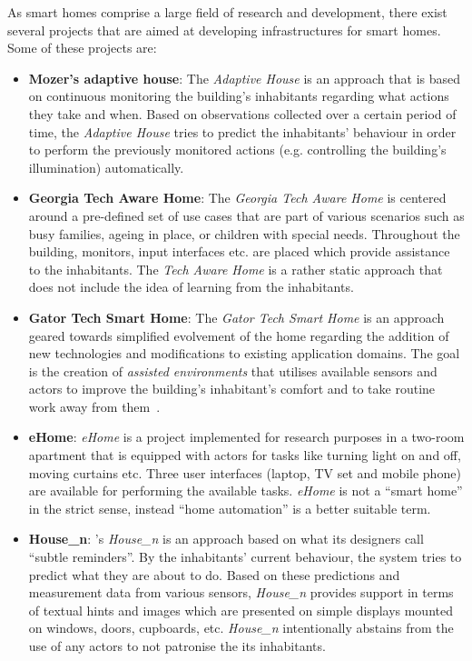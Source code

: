 As smart homes comprise a large field of research and development, there exist several projects that are aimed at developing infrastructures for smart homes. Some of these projects are:
\begin{itemize}
  \item \textbf{Mozer's adaptive house}: The \emph{Adaptive House} is an approach that is based on continuous monitoring the building's inhabitants regarding what actions they take and when. Based on observations collected over a certain period of time, the \emph{Adaptive House} tries to predict the inhabitants' behaviour in order to perform the previously monitored actions (e.g. controlling the building's illumination) automatically.~\cite{adaptivehouse}
  \item \textbf{Georgia Tech Aware Home}: The \emph{Georgia Tech Aware Home} is centered around a pre-defined set of use cases that are part of various scenarios such as busy families, ageing in place, or children with special needs. Throughout the building, monitors, input interfaces etc. are placed which provide assistance to the inhabitants. The \emph{Tech Aware Home} is a rather static approach that does not include the idea of learning from the inhabitants.~\cite{techawarehome}
  \item \textbf{Gator Tech Smart Home}: The \emph{Gator Tech Smart Home} is an approach geared towards simplified evolvement of the home regarding the addition of new technologies and modifications to existing application domains. The goal is the creation of \emph{assisted environments} that utilises available sensors and actors to improve the building's inhabitant's comfort and to take routine work away from them~\cite{gator_tech}.
  \item \textbf{eHome}: \emph{eHome} is a project implemented for research purposes in a two-room apartment that is equipped with actors for tasks like turning light on and off, moving curtains etc. Three user interfaces (laptop, TV set and mobile phone) are available for performing the available tasks. \emph{eHome} is not a ``smart home'' in the strict sense, instead ``home automation'' is a better suitable term.~\cite{ehome}
  \item \textbf{House\_n}: 's \emph{House\_n} is an approach based on what its designers call ``subtle reminders''. By the inhabitants' current behaviour, the system tries to predict what they are about to do. Based on these predictions and measurement data from various sensors, \emph{House\_n} provides support in terms of textual hints and images which are presented on simple displays mounted on windows, doors, cupboards, etc. \emph{House\_n} intentionally abstains from the use of any actors to not patronise the its inhabitants.~\cite{housen}
\end{itemize}

